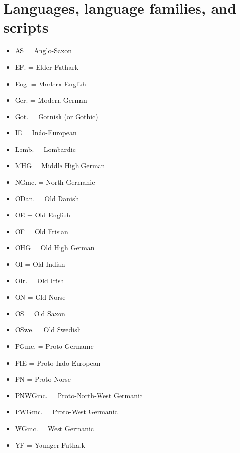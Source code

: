 \section{Languages, language families, and scripts}
\begin{itemize}%
	\item AS = Anglo-Saxon
	\item EF. = Elder Futhark
	\item Eng. = Modern English
	\item Ger. = Modern German
	\item Got. = Gotnish (or Gothic)
	\item IE = Indo-European
	\item Lomb. = Lombardic
	\item MHG = Middle High German
	\item NGmc. = North Germanic
	\item ODan. = Old Danish
	\item OE = Old English
	\item OF = Old Frisian
	\item OHG = Old High German
	\item OI = Old Indian
	\item OIr. = Old Irish
	\item ON = Old Norse
	\item OS = Old Saxon
	\item OSwe. = Old Swedish
	\item PGmc. = Proto-Germanic
	\item PIE = Proto-Indo-European
	\item PN = Proto-Norse
	\item PNWGmc. = Proto-North-West Germanic
	\item PWGmc. = Proto-West Germanic
	\item WGmc. = West Germanic
	\item YF = Younger Futhark
\end{itemize}

